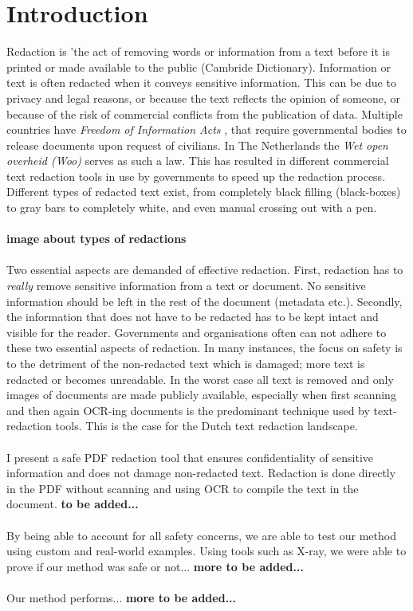 \chapter{Introduction}

Redaction is 'the act of removing words or information from a text before it is printed or made available to the public (Cambride Dictionary). Information or text is often redacted when it conveys sensitive information. This can be due to privacy and legal reasons, or because the text reflects the opinion of someone, or because of the risk of commercial conflicts from the publication of data. Multiple countries have \textit{Freedom of Information Acts} \cite{USAFia}, that require governmental bodies to release documents upon request of civilians. In The Netherlands the \textit{Wet open overheid (Woo)} \cite{WooWebsite} serves as such a law. This has resulted in different commercial text redaction tools in use by governments to speed up the redaction process. Different types of redacted text exist, from completely black filling (black-boxes) to gray bars to completely white, and even manual crossing out with a pen.
\\\\
\textbf{image about types of redactions}
\\\\
Two essential aspects are demanded of effective redaction. First, redaction has to \textit{really} remove sensitive information from a text or document. No sensitive information should be left in the rest of the document (metadata etc.). Secondly, the information that does not have to be redacted has to be kept intact and visible for the reader. Governments and organisations often can not adhere to these two essential aspects of redaction. In many instances, the focus on safety is to the detriment of the non-redacted text which is damaged; more text is redacted or becomes unreadable. In the worst case all text is removed and only images of documents are made publicly available, especially when first scanning and then again OCR-ing documents is the predominant technique used by text-redaction tools. This is the case for the Dutch text redaction landscape.
\\\\
I present a safe PDF redaction tool that ensures confidentiality of sensitive information and does not damage non-redacted text. Redaction is done directly in the PDF without scanning and using OCR to compile the text in the document. \textbf{to be added...}
\\\\
By being able to account for all safety concerns, we are able to test our method using custom and real-world examples. Using tools such as X-ray, we were able to prove if our method was safe or not... \textbf{more to be added...}
\\\\
Our method performs... \textbf{more to be added...}


